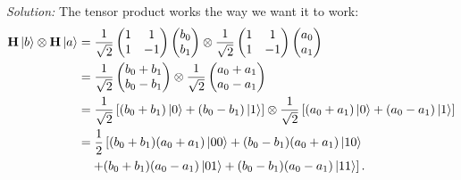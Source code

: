 \documentclass{book}
\theoremstyle{definition}
\newcommand{\nn}{\nonumber}
\newcommand{\f}[2]{\frac{#1}{#2}}
\newcommand{\lb}{\left[}
\newcommand{\rb}{\right]}
\newcommand{\had}{\mathbf{H}}
\begin{document}
\noindent \textit{Solution:} The tensor product works the way we want it to work:
\begin{align}\label{first}
\had \ket{b} \otimes \had\ket{a} &= \f{1}{\sqrt{2}}\begin{pmatrix}
1 & 1 \\ 1 & -1
\end{pmatrix}\begin{pmatrix}
b_0 \\ b_1
\end{pmatrix}  \otimes \f{1}{\sqrt{2}}\begin{pmatrix}
1 & 1 \\ 1 & -1
\end{pmatrix}\begin{pmatrix}
a_0 \\ a_1
\end{pmatrix}  \nn\\
&= \f{1}{\sqrt{2}} \begin{pmatrix}
b_0 + b_1 \\ b_0 - b_1
\end{pmatrix} \otimes \f{1}{\sqrt{2}}\begin{pmatrix}
a_0 + a_1 \\ a_0 - a_1
\end{pmatrix} \nn\\
&= \f{1}{\sqrt{2}}\lb (b_0+b_1)\ket{0} + (b_0 - b_1)\ket{1} \rb \otimes \f{1}{\sqrt{2}}\lb (a_0+a_1)\ket{0} + (a_0 - a_1)\ket{1} \rb \nn\\
&= \f{1}{2}\lb (b_0+b_1)(a_0+a_1)\ket{00} + (b_0-b_1)(a_0+a_1)\ket{10}\right. \nn\\
&\left.\quad + (b_0+b_1)(a_0-a_1)\ket{01} + (b_0-b_1)(a_0-a_1)\ket{11} \rb.
\end{align}
\end{document}
